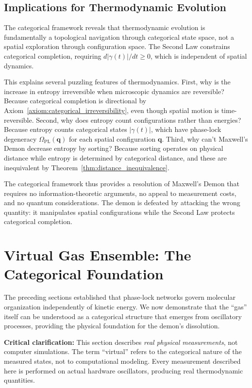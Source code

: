 \documentclass[12pt,a4paper]{article}
\theoremstyle{definition}
\theoremstyle{remark}
\begin{document}
\subsection{Implications for Thermodynamic Evolution}

The categorical framework reveals that thermodynamic evolution is fundamentally a topological navigation through categorical state space, not a spatial exploration through configuration space. The Second Law constrains categorical completion, requiring $d|\gamma(t)|/dt \geq 0$, which is independent of spatial dynamics.

This explains several puzzling features of thermodynamics. First, why is the increase in entropy irreversible when microscopic dynamics are reversible? Because categorical completion is directional by Axiom~\ref{axiom:categorical_irreversibility}, even though spatial motion is time-reversible. Second, why does entropy count configurations rather than energies? Because entropy counts categorical states $|\gamma(t)|$, which have phase-lock degeneracy $\Omega_{\text{PL}}(\mathbf{q})$ for each spatial configuration $\mathbf{q}$. Third, why can't Maxwell's Demon decrease entropy by sorting? Because sorting operates on physical distance while entropy is determined by categorical distance, and these are inequivalent by Theorem~\ref{thm:distance_inequivalence}.

The categorical framework thus provides a resolution of Maxwell's Demon that requires no information-theoretic arguments, no appeal to measurement costs, and no quantum considerations. The demon is defeated by attacking the wrong quantity: it manipulates spatial configurations while the Second Law protects categorical completion.

\section{Virtual Gas Ensemble: The Categorical Foundation}
\label{sec:virtual_gas}

The preceding sections established that phase-lock networks govern molecular organization independently of kinetic energy. We now demonstrate that the ``gas'' itself can be understood as a categorical structure that emerges from oscillatory processes, providing the physical foundation for the demon's dissolution.

\textbf{Critical clarification:} This section describes \textit{real physical measurements}, not computer simulations. The term ``virtual'' refers to the categorical nature of the measured states, not to computational modeling. Every measurement described here is performed on actual hardware oscillators, producing real thermodynamic quantities.
\end{document}

